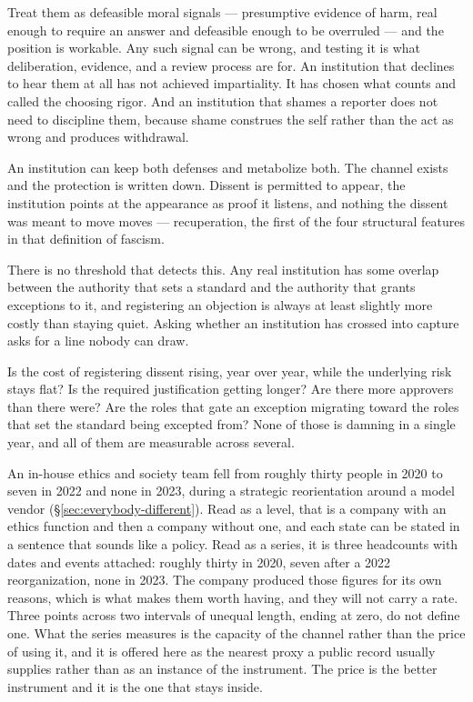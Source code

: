 Treat them as defeasible moral signals — presumptive evidence of harm, real enough to require an answer and defeasible enough to be overruled — and the position is workable. Any such signal can be wrong, and testing it is what deliberation, evidence, and a review process are for. An institution that declines to hear them at all has not achieved impartiality. It has chosen what counts and called the choosing rigor. And an institution that shames a reporter does not need to discipline them, because shame construes the self rather than the act as wrong and produces withdrawal.

An institution can keep both defenses and metabolize both. The channel exists and the protection is written down. Dissent is permitted to appear, the institution points at the appearance as proof it listens, and nothing the dissent was meant to move moves — recuperation, the first of the four structural features in that definition of fascism.

There is no threshold that detects this. Any real institution has some overlap between the authority that sets a standard and the authority that grants exceptions to it, and registering an objection is always at least slightly more costly than staying quiet. Asking whether an institution has crossed into capture asks for a line nobody can draw.

Is the cost of registering dissent rising, year over year, while the underlying risk stays flat? Is the required justification getting longer? Are there more approvers than there were? Are the roles that gate an exception migrating toward the roles that set the standard being excepted from? None of those is damning in a single year, and all of them are measurable across several.

An in-house ethics and society team fell from roughly thirty people in 2020 to seven in 2022 and none in 2023, during a strategic reorientation around a model vendor (§\ref{sec:everybody-different}). Read as a level, that is a company with an ethics function and then a company without one, and each state can be stated in a sentence that sounds like a policy. Read as a series, it is three headcounts with dates and events attached: roughly thirty in 2020, seven after a 2022 reorganization, none in 2023. The company produced those figures for its own reasons, which is what makes them worth having, and they will not carry a rate. Three points across two intervals of unequal length, ending at zero, do not define one. What the series measures is the capacity of the channel rather than the price of using it, and it is offered here as the nearest proxy a public record usually supplies rather than as an instance of the instrument. The price is the better instrument and it is the one that stays inside.

